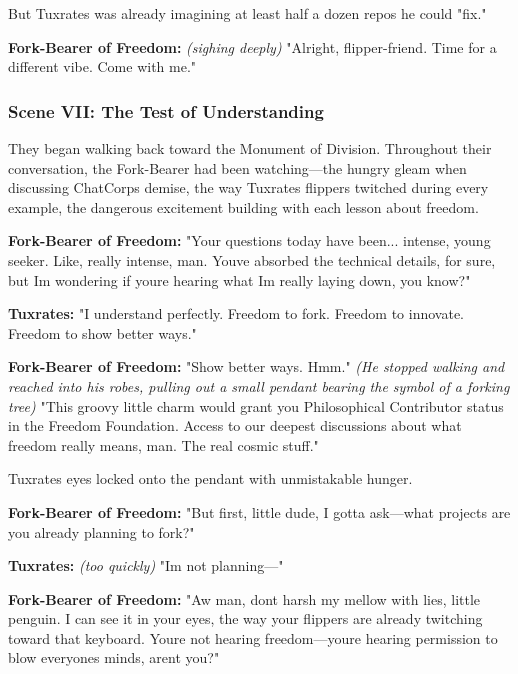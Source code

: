 But Tuxrates was already imagining at least half a dozen repos he could "fix."

\textbf{Fork-Bearer of Freedom:} \emph{(sighing deeply)} "Alright, flipper-friend. Time for a different vibe. Come with me."

\bookdivider

\subsubsection{Scene VII: The Test of Understanding}\label{scene-vii-the-test-of-understanding}

They began walking back toward the Monument of Division. Throughout their conversation, the Fork-Bearer had been watching---the hungry gleam when discussing ChatCorp\textquotesingle s demise, the way Tuxrates\textquotesingle{} flippers twitched during every example, the dangerous excitement building with each lesson about freedom.

\textbf{Fork-Bearer of Freedom:} "Your questions today have been... intense, young seeker. Like, really intense, man. You\textquotesingle ve absorbed the technical details, for sure, but I\textquotesingle m wondering if you\textquotesingle re hearing what I\textquotesingle m really laying down, you know?"

\textbf{Tuxrates:} "I understand perfectly. Freedom to fork. Freedom to innovate. Freedom to show better ways."

\textbf{Fork-Bearer of Freedom:} "\textquotesingle Show better ways.\textquotesingle{} Hmm." \emph{(He stopped walking and reached into his robes, pulling out a small pendant bearing the symbol of a forking tree)} "This groovy little charm would grant you \textquotesingle Philosophical Contributor\textquotesingle{} status in the Freedom Foundation. Access to our deepest discussions about what freedom really means, man. The real cosmic stuff."

Tuxrates\textquotesingle{} eyes locked onto the pendant with unmistakable hunger.

\textbf{Fork-Bearer of Freedom:} "But first, little dude, I gotta ask---what projects are you already planning to fork?"

\textbf{Tuxrates:} \emph{(too quickly)} "I\textquotesingle m not planning---"

\textbf{Fork-Bearer of Freedom:} "Aw man, don\textquotesingle t harsh my mellow with lies, little penguin. I can see it in your eyes, the way your flippers are already twitching toward that keyboard. You\textquotesingle re not hearing \textquotesingle freedom\textquotesingle---you\textquotesingle re hearing \textquotesingle permission to blow everyone\textquotesingle s minds,\textquotesingle{} aren\textquotesingle t you?"

